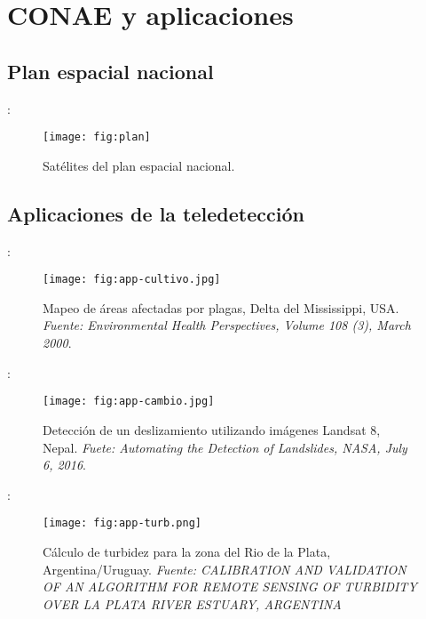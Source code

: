\section{CONAE y aplicaciones}
\subsection{Plan espacial nacional}
\begin{frame}{\secname : \subsecname}
  \begin{figure}
    \centering
    \texttt{[image: fig:plan]}
    \caption{Satélites del plan espacial nacional.}
    \label{}
  \end{figure}
\end{frame}

\subsection{Aplicaciones de la teledetección}

\begin{frame}{\secname : \subsecname}
  \begin{figure}
    \centering
    \texttt{[image: fig:app-cultivo.jpg]}
    \caption{Mapeo de áreas afectadas por plagas, Delta del Mississippi, USA. \emph{Fuente: Environmental Health Perspectives, Volume 108 (3), March 2000}.}
    \label{}
  \end{figure}
\end{frame}

\begin{frame}{\secname : \subsecname}
  \begin{figure}
    \centering
    \texttt{[image: fig:app-cambio.jpg]}
    \caption{Detección de un deslizamiento utilizando imágenes Landsat 8, Nepal. \emph{Fuete: Automating the Detection of Landslides, NASA, July 6, 2016}.}
    \label{}
  \end{figure}
\end{frame}

\begin{frame}{\secname : \subsecname}
  \begin{figure}
    \centering
    \texttt{[image: fig:app-turb.png]}
    \caption{Cálculo de turbidez para la zona del Rio de la Plata, Argentina/Uruguay. \emph{Fuente: CALIBRATION AND VALIDATION OF AN ALGORITHM FOR REMOTE SENSING OF TURBIDITY OVER LA PLATA RIVER ESTUARY, ARGENTINA}}
    \label{}
  \end{figure}
\end{frame}

